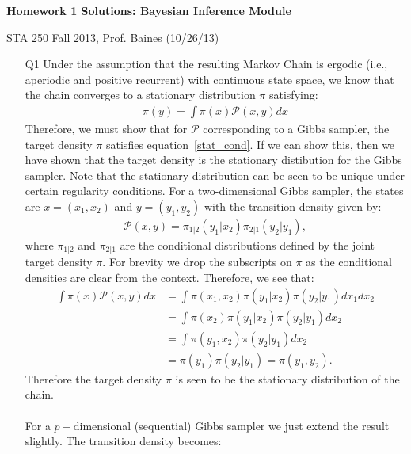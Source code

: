 \documentclass[11pt]{article}
\begin{document}
\textbf{Homework 1 Solutions: Bayesian Inference Module}

\begin{flushright}
 STA 250 Fall 2013, Prof. Baines (10/26/13)
\end{flushright}

\begin{itemize}

 \item[Q1] Under the assumption that the resulting Markov Chain is ergodic (i.e., aperiodic and positive recurrent) with continuous state space, we know that the chain converges to a stationary distribution $\pi$ satisfying:
 \begin{align}\label{stat_cond}
 \pi(y) = \int{}\pi(x)\mathcal{P}(x,y)dx  
 \end{align}
 Therefore, we must show that for $\mathcal{P}$ corresponding to a Gibbs sampler, the target density $\pi$ satisfies equation~\eqref{stat_cond}. If we can show this, then we have shown that the target density is the stationary distibution for the Gibbs sampler. Note that the stationary distribution can be seen to be unique under certain regularity conditions. For a two-dimensional Gibbs sampler, the states are $x=(x_{1},x_{2})$ and $y=(y_{1},y_{2})$ with the transition density given by:
 \begin{align*}
 \mathcal{P}(x,y) = \pi_{1|2}(y_{1}|x_{2})\pi_{2|1}(y_{2}|y_{1}) ,
 \end{align*}
 where $\pi_{1|2}$ and $\pi_{2|1}$ are the conditional distributions defined by the joint target density $\pi$. For brevity we drop the subscripts on $\pi$ as the conditional densities are clear from the context. Therefore, we see that:
 \begin{align*}
 \int{}\pi(x)\mathcal{P}(x,y)dx  &= \int{}\pi(x_{1},x_{2})\pi(y_{1}|x_{2})\pi(y_{2}|y_{1})dx_{1}dx_{2} \\
                                 &= \int{}\pi(x_{2})\pi(y_{1}|x_{2})\pi(y_{2}|y_{1})dx_{2} \\ 
                                 &= \int{}\pi(y_{1},x_{2})\pi(y_{2}|y_{1})dx_{2} \\ 
                                 &= \pi(y_{1})\pi(y_{2}|y_{1}) = \pi(y_{1},y_{2}) .
 \end{align*}
Therefore the target density $\pi$ is seen to be the stationary distribution of the chain.\\
$ $\\
For a $p-$dimensional (sequential) Gibbs sampler we just extend the result slightly. The transition density becomes:

\end{itemize}
\end{document}
